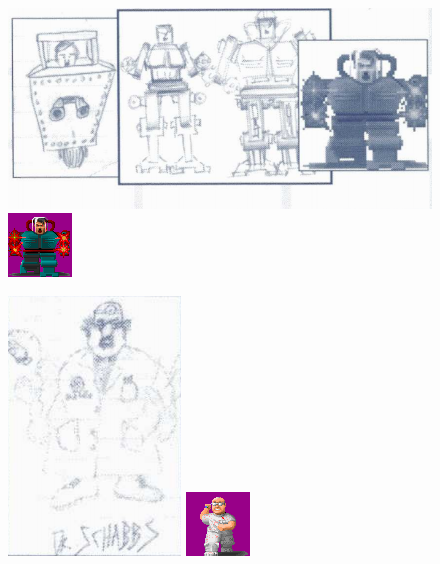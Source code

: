 \documentclass[book.tex]{subfiles}
\begin{document}
  \begin{figure}[H]
\centering
 \includegraphics[scale=0.5]{imgs/tom_hall_sketch_adolf.png}
  \includegraphics[scale=5]{imgs/sprites/adolf.png}
 \end{figure}
 
   \begin{figure}[H]
\centering
 \includegraphics[scale=1]{imgs/tom_hall_sketch_dr_schabbs.png}
   \includegraphics[scale=10]{imgs/sprites/schabbs.png}
 \end{figure}
 
\end{document}
